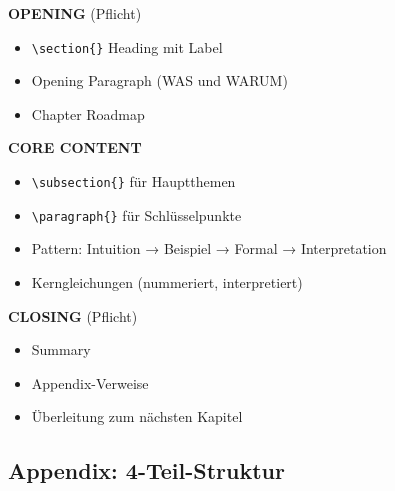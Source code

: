 \documentclass[12pt,a4paper]{article}
\begin{document}
\begin{tcolorbox}[colback=bcmblue!5!white, colframe=bcmblue!75!black]
\textbf{OPENING} (Pflicht)
\begin{itemize}[nosep]
\item \texttt{\textbackslash section\{\}} Heading mit Label
\item Opening Paragraph (WAS und WARUM)
\item Chapter Roadmap
\end{itemize}

\textbf{CORE CONTENT}
\begin{itemize}[nosep]
\item \texttt{\textbackslash subsection\{\}} für Hauptthemen
\item \texttt{\textbackslash paragraph\{\}} für Schlüsselpunkte
\item Pattern: Intuition → Beispiel → Formal → Interpretation
\item Kerngleichungen (nummeriert, interpretiert)
\end{itemize}

\textbf{CLOSING} (Pflicht)
\begin{itemize}[nosep]
\item Summary
\item Appendix-Verweise
\item Überleitung zum nächsten Kapitel
\end{itemize}
\end{tcolorbox}

\subsection{Appendix: 4-Teil-Struktur}
\end{document}
